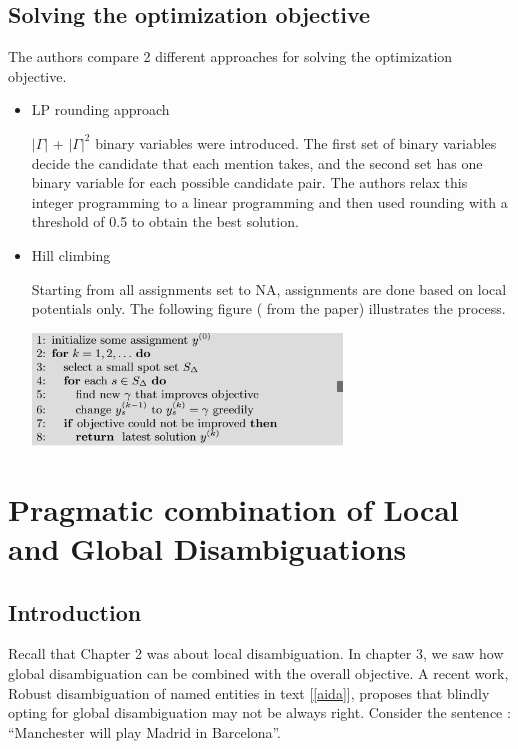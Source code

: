  
  \section{Solving the optimization objective}
  The authors compare 2 different approaches for solving the optimization objective.
  \begin{itemize}
   \item LP rounding approach\bigskip
   
    $|\Gamma|$ + $|\Gamma|^2$ binary variables were introduced. The first set of binary variables decide the candidate that
   each mention takes, and the second set has one binary variable for each possible candidate pair. 
   The authors relax this integer programming to a linear programming and then used rounding with a threshold of 0.5 to
   obtain the best solution.
   
   \item Hill climbing
   
   Starting from all assignments set to NA, assignments are done based on local potentials only. The following figure (
   from the paper) illustrates the process.
   \begin{center}
    \includegraphics[height = 3cm]{hill}
   \end{center}

  \end{itemize}


\chapter{Pragmatic combination of Local and Global Disambiguations}

\section{Introduction}

Recall that Chapter 2 was about local disambiguation. In chapter 3, we saw how
global disambiguation can be combined with the overall objective. A recent work, 
Robust disambiguation of named entities in text [\ref{aida}], proposes that 
blindly opting for global disambiguation may not be always right. 
Consider the sentence : ``Manchester will play Madrid in Barcelona''.

